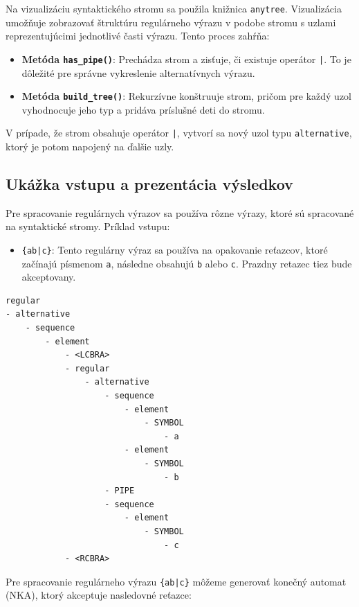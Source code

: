\documentclass[a4paper,12pt]{article}
\begin{document}
Na vizualizáciu syntaktického stromu sa použila knižnica \texttt{anytree}. Vizualizácia umožňuje zobrazovať štruktúru regulárneho výrazu v podobe stromu s uzlami reprezentujúcimi jednotlivé časti výrazu. Tento proces zahŕňa:

\begin{itemize}
    \item \textbf{Metóda \texttt{has\_pipe()}}: Prechádza strom a zisťuje, či existuje operátor \texttt{|}. To je dôležité pre správne vykreslenie alternatívnych výrazu.
    \item \textbf{Metóda \texttt{build\_tree()}}: Rekurzívne konštruuje strom, pričom pre každý uzol vyhodnocuje jeho typ a pridáva príslušné deti do stromu.
\end{itemize}

V prípade, že strom obsahuje operátor \texttt{|}, vytvorí sa nový uzol typu \texttt{alternative}, ktorý je potom napojený na ďalšie uzly.


\subsection{Ukážka vstupu a prezentácia výsledkov}
Pre spracovanie regulárnych výrazov sa používa rôzne výrazy, ktoré sú spracované na syntaktické stromy. Príklad vstupu:

\newpage
\begin{itemize}
    \item \texttt{\{ab|c\}}: Tento regulárny výraz sa používa na opakovanie reťazcov, ktoré začínajú písmenom \texttt{a}, následne obsahujú \texttt{b} alebo \texttt{c}. Prazdny retazec tiez bude akceptovany.
\end{itemize}

\begin{verbatim}
regular
- alternative
    - sequence
        - element
            - <LCBRA>
            - regular
                - alternative
                    - sequence
                        - element
                            - SYMBOL
                                - a
                        - element
                            - SYMBOL
                                - b
                    - PIPE
                    - sequence
                        - element
                            - SYMBOL
                                - c
            - <RCBRA>
    \end{verbatim}

Pre spracovanie regulárneho výrazu \texttt{\{ab|c\}} môžeme generovať konečný automat (NKA), ktorý akceptuje nasledovné reťazce:
\end{document}

